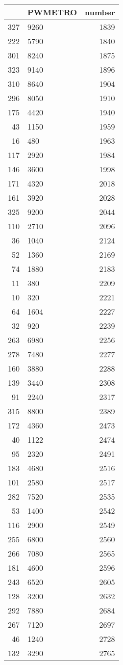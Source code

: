 \begin{table}[ht]
\centering
\begin{tabular}{rlr}
  \hline
 & PWMETRO & number \\ 
  \hline
327 & 9260 & 1839 \\ 
  222 & 5790 & 1840 \\ 
  301 & 8240 & 1875 \\ 
  323 & 9140 & 1896 \\ 
  310 & 8640 & 1904 \\ 
  296 & 8050 & 1910 \\ 
  175 & 4420 & 1940 \\ 
  43 & 1150 & 1959 \\ 
  16 & 480 & 1963 \\ 
  117 & 2920 & 1984 \\ 
  146 & 3600 & 1998 \\ 
  171 & 4320 & 2018 \\ 
  161 & 3920 & 2028 \\ 
  325 & 9200 & 2044 \\ 
  110 & 2710 & 2096 \\ 
  36 & 1040 & 2124 \\ 
  52 & 1360 & 2169 \\ 
  74 & 1880 & 2183 \\ 
  11 & 380 & 2209 \\ 
  10 & 320 & 2221 \\ 
  64 & 1604 & 2227 \\ 
  32 & 920 & 2239 \\ 
  263 & 6980 & 2256 \\ 
  278 & 7480 & 2277 \\ 
  160 & 3880 & 2288 \\ 
  139 & 3440 & 2308 \\ 
  91 & 2240 & 2317 \\ 
  315 & 8800 & 2389 \\ 
  172 & 4360 & 2473 \\ 
  40 & 1122 & 2474 \\ 
  95 & 2320 & 2491 \\ 
  183 & 4680 & 2516 \\ 
  101 & 2580 & 2517 \\ 
  282 & 7520 & 2535 \\ 
  53 & 1400 & 2542 \\ 
  116 & 2900 & 2549 \\ 
  255 & 6800 & 2560 \\ 
  266 & 7080 & 2565 \\ 
  181 & 4600 & 2596 \\ 
  243 & 6520 & 2605 \\ 
  128 & 3200 & 2632 \\ 
  292 & 7880 & 2684 \\ 
  267 & 7120 & 2697 \\ 
  46 & 1240 & 2728 \\ 
  132 & 3290 & 2765 \\ 
   \hline
\end{tabular}
\end{table}
